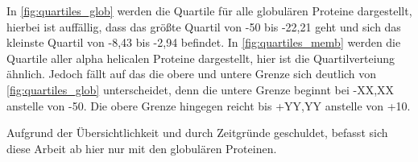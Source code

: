 
In \ref{fig:quartiles_glob} werden die Quartile für alle globulären Proteine dargestellt, hierbei ist auffällig, dass das größte Quartil von -50 bis -22,21 geht und sich das kleinste Quartil von -8,43 bis -2,94 befindet. In \ref{fig:quartiles_memb} werden die Quartile aller alpha helicalen Proteine dargestellt, hier ist die Quartilverteiung ähnlich. Jedoch fällt auf das die obere und untere Grenze sich deutlich von \ref{fig:quartiles_glob} unterscheidet, denn die untere Grenze beginnt bei -XX,XX anstelle von -50. Die obere Grenze hingegen reicht bis +YY,YY anstelle von +10.

Aufgrund der Übersichtlichkeit und durch Zeitgründe geschuldet, befasst sich diese Arbeit ab hier nur mit den globulären Proteinen.


